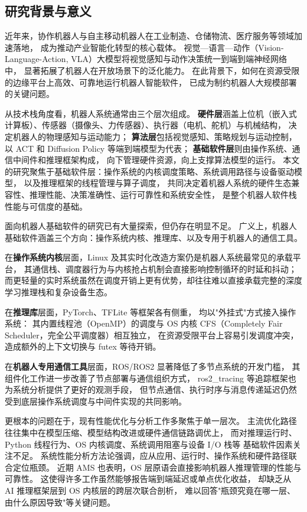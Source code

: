 \subsection{研究背景与意义}

近年来，协作机器人与自主移动机器人在工业制造、仓储物流、医疗服务等领域加速落地，
成为推动产业智能化转型的核心载体。
视觉—语言—动作（Vision-Language-Action, VLA）大模型将视觉感知与动作决策统一到端到端神经网络中，
显著拓展了机器人在开放场景下的泛化能力。
在此背景下，如何在资源受限的边缘平台上高效、可靠地运行机器人智能软件，
已成为制约机器人大规模部署的关键问题。

从技术栈角度看，机器人系统通常由三个层次组成。
\textbf{硬件层}涵盖上位机（嵌入式计算板）、传感器（摄像头、力传感器）、执行器（电机、舵机）与机械结构，
决定机器人的物理感知与运动能力；
\textbf{算法层}包括视觉感知、策略规划与运动控制，
以 ACT\cite{act} 和 Diffusion Policy\cite{diffusionpolicy} 等端到端模型为代表；
\textbf{基础软件层}则由操作系统、通信中间件和推理框架构成，
向下管理硬件资源，向上支撑算法模型的运行。
本文的研究聚焦于基础软件层：操作系统的内核调度策略、系统调用路径与设备驱动模型，
以及推理框架的线程管理与算子调度，
共同决定着机器人系统的硬件生态兼容性、推理性能、决策准确性、运行可靠性和系统安全性，
是整个机器人软件栈性能与可信度的基础。

面向机器人基础软件的研究已有大量探索，但仍存在明显不足。
广义上，机器人基础软件涵盖三个方向：操作系统内核、推理库、以及专用于机器人的通信工具。

在\textbf{操作系统内核}层面，Linux 及其实时化改造方案仍是机器人系统最常见的承载平台，
其通信栈、调度器行为与内核抢占机制会直接影响控制循环的时延和抖动；
而更轻量的实时系统虽然在调度开销上更有优势，却往往难以直接承载完整的深度学习推理栈和复杂设备生态\cite{rtlinux}。

在\textbf{推理库}层面，PyTorch\cite{pytorch}、TFLite\cite{tflite} 等框架各有侧重，
均以"外挂式"方式接入操作系统：
其内置线程池（OpenMP）的调度与 OS 内核 CFS（Completely Fair Scheduler，完全公平调度器）相互独立，
在资源受限平台上容易引发调度冲突，造成额外的上下文切换与 futex 等待开销。

在\textbf{机器人专用通信工具}层面，ROS/ROS2\cite{ros2}
显著降低了多节点系统的开发门槛，
其组件化工作进一步改善了节点部署与通信组织方式\cite{ros2composition}，
ros2\_tracing\cite{ros2tracing} 等追踪框架也为系统分析提供了更好的观测手段，
但节点通信、执行时序与消息传递延迟仍然受到底层操作系统调度与中间件实现的共同影响。

更根本的问题在于，现有性能优化与分析工作多聚焦于单一层次。
主流优化路径往往集中在模型压缩、模型结构改进或硬件通信链路调优上，
而对推理运行时、Python 线程行为、OS 内核调度、系统调用阻塞与设备 I/O 栈等
基础软件因素关注不足。
系统性能分析方法论强调，应从应用、运行时、操作系统和硬件路径联合定位瓶颈\cite{perfbook}。
近期 AMS 也表明，OS 层原语会直接影响机器人推理管理的性能与可靠性\cite{ams}。
这使得许多工作虽然能够报告端到端延迟或单点优化收益，
却缺乏从 AI 推理框架层到 OS 内核层的跨层次联合剖析，
难以回答"瓶颈究竟在哪一层、由什么原因导致"等关键问题。

